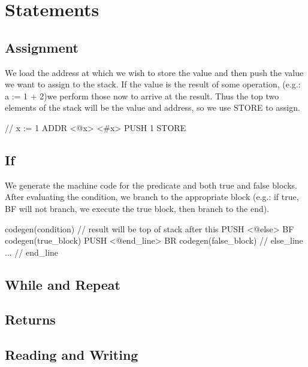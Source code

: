 \section{Statements}
\subsection{Assignment}

We load the address at which we wish to store the value and then push the value
we want to assign to the stack. If the value is the result of some operation, 
(e.g.: a := 1 + 2)we perform those now to arrive at the result. Thus the top two 
elements of the stack will be the value and address, so we use STORE to assign.

\begin{code}[Assignment]
// x := 1
ADDR <@x> <#x>
PUSH 1
STORE
\end{code}

\subsection{If}

We generate the machine code for the predicate and both true and false blocks.
After evaluating the condition, we branch to the appropriate block (e.g.: if true,
BF will not branch, we execute the true block, then branch to the end).

\begin{code}[IfStatement]
codegen(condition)      // result will be top of stack after this
PUSH <@else>
BF   
codegen(true_block)             
PUSH <@end_line> 
BR           
codegen(false_block)    // else_line
...                     // end_line
\end{code}

\subsection{While and Repeat}
\subsection{Returns}
\subsection{Reading and Writing}
